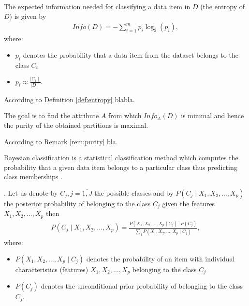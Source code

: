 \begin{definition}
\label{def:entropy}
The expected information needed for classifying a data item in $D$ (the entropy of $D$) is given by
\begin{align}
Info(D) = - \sum_{i=1}^{m}p_{i}\log_{2}(p_{i}),
\end{align}
where:
\begin{itemize}
\item $p_{i}$ denotes the probability that a data item from the dataset belongs to the class $C_{i}$
\item $p_{i} \approx \frac{\mid C_{i} \mid }{\mid D \mid} $.
\end{itemize}
\end{definition}

According to Definition \ref{def:entropy} blabla.

\begin{remark}
\label{rem:purity}
The goal is to find the attribute $A$ from which $Info_{A}(D)$ is minimal and hence the purity of the obtained partitions is maximal.
\end{remark}

According to Remark \ref{rem:purity} bla.

Bayesian classification is a statistical classification method which computes the probability that a given data item belongs to a particular class thus predicting class memberships \cite{Ben08Encyclopedia}.

\begin{theorem}. Let us denote by $C_j , j=\overline{1,J}$ the possible classes and by $P(C_{j} \mid X_{1},X_{2}, \dots , X_{p})$
the posterior probability of belonging to the  class $C_j$ given the features $X_{1} , X_{2} , \dots , X_{p}$ then
\begin{align*}
P(C_{j} \mid X_{1},X_{2}, \dots , X_{p}) = \frac{P( X_{1} , X_{2} , \dots, X_{p} \mid C_{j} ) \cdot P(C_{j})
}{\sum_{j}P( X_{1} , X_{2} , \dots, X_{p} \mid C_{j})},
\end{align*}
where:
\begin{itemize}
\item $P( X_{1} , X_{2} , \dots, X_{p} \mid C_{j} )$ denotes the probability of an item with individual characteristics (features) $X_{1} , X_{2} , \dots , X_{p}$ belonging to the class $C_j$
\item  $P(C_{j} )$ denotes the unconditional prior probability of belonging to the class $C_j$.
\end{itemize}
\end{theorem}

